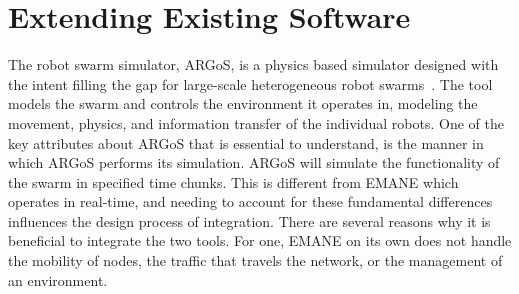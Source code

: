 \section{Extending Existing Software}
The robot swarm simulator, ARGoS, is a physics based simulator designed with the intent filling the gap for large-scale heterogeneous robot swarms~\cite{argos}.
The tool models the swarm and controls the environment it operates in, modeling the movement, physics, and information transfer of the individual robots.
One of the key attributes about ARGoS that is essential to understand, is the manner in which ARGoS performs its simulation.
ARGoS will simulate the functionality of the swarm in specified time chunks.
This is different from EMANE which operates in real-time, and needing to account for these fundamental differences influences the design process of integration.
There are several reasons why it is beneficial to integrate the two tools.
For one, EMANE on its own does not handle the mobility of nodes, the traffic that travels the network, or the management of an environment.
